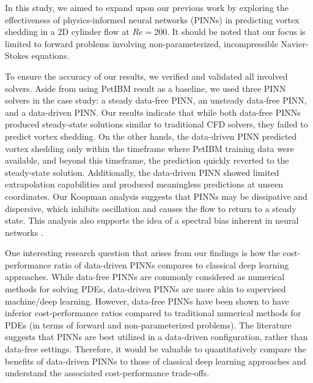 
In this study, we aimed to expand upon our previous work \cite{chuang_experience_2022} by exploring the effectiveness of physics-informed neural networks (PINNs) in predicting vortex shedding in a 2D cylinder flow at $Re = 200$.
It should be noted that our focus is limited to forward problems involving non-parameterized, incompressible Navier-Stokes equations.

To ensure the accuracy of our results, we verified and validated all involved solvers.
Aside from using PetIBM result as a baseline, we used three PINN solvers in the case study: a steady data-free PINN, an unsteady data-free PINN, and a data-driven PINN.
Our results indicate that while both data-free PINNs produced steady-state solutions similar to traditional CFD solvers, they failed to predict vortex shedding.
On the other hands, the data-driven PINN predicted vortex shedding only within the timeframe where PetIBM training data were available, and beyond this timeframe, the prediction quickly reverted to the steady-state solution.
Additionally, the data-driven PINN showed limited extrapolation capabilities and produced meaningless predictions at unseen coordinates.
Our Koopman analysis suggests that PINNs may be dissipative and dispersive, which inhibits oscillation and causes the flow to return to a steady state.
This analysis also supports the idea of a spectral bias inherent in neural networks \cite{rahaman_spectral_2019}.

One interesting research question that arises from our findings is how the cost-performance ratio of data-driven PINNs compares to classical deep learning approaches.
While data-free PINNs are commonly considered as numerical methods for solving PDEs, data-driven PINNs are more akin to supervised machine/deep learning.
However, data-free PINNs have been shown to have inferior cost-performance ratios compared to traditional numerical methods for PDEs (in terms of forward and non-parameterized problems).
The literature suggests that PINNs are best utilized in a data-driven configuration, rather than data-free settings.
Therefore, it would be valuable to quantitatively compare the benefits of data-driven PINNs to those of classical deep learning approaches and understand the associated cost-performance trade-offs.

